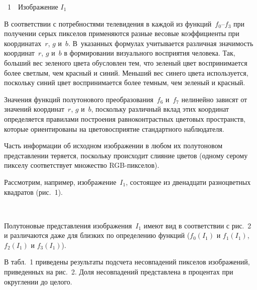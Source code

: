 \begin{multicols}{2}
\begin{center}
{{\figurename~1}\ \ \small{Изображение $I_1$}}
  \end{center}

\vspace*{3pt}

\renewcommand{\figurename}{\protect\bf Рис.}
\renewcommand{\tablename}{\protect\bf Таблица}
\setcounter{figure}{2}
\setcounter{table}{1}





  В соответствии с потребностями телевидения в каждой из функций~$f_0$--$f_3$
  при получении серых пикселов применяются разные весовые
коэффициенты при координатах~$r$, $g$ и~$b$.
%
В~указанных формулах
учитывается различная значимость координат~$r$, $g$ и~$b$ в формировании
визуального восприятия человека. Так, больший вес зеленого цвета обусловлен
тем, что зеленый цвет воспринимается более светлым, чем красный и синий.
Меньший вес синего цвета используется, поскольку синий цвет
воспринимается более темным, чем зеленый и красный.

  Значения функций полутонового преобразо\-вания~$f_6$ и~$f_7$ нелинейно
зависят от значений ко\-ор\-динат~$r$, $g$ и~$b$, поскольку различный вклад
этих координат определяется правилами по\-стро\-ения равноконтраст\-ных
цветовых пространств, которые ориентированы на цветовосприятие
стандартного наблюдателя.

  Часть информации об исходном изображении в любом их полутоновом
представлении теряется, поскольку происходит слияние цветов (одному серому
пикселу соответствует множество RGB-пик\-селов).

  Рассмотрим, например, изображение~$I_1$, со\-сто\-ящее из двенадцати
разноцветных квадратов (рис.~1).

\begin{figure*}[b] %
\vspace*{1pt}
\begin{center}
\mbox{%
\epsfxsize=164mm
}
\end{center}
\vspace*{-9pt}
\end{figure*}


  Полутоновые представления изображения~$I_1$ имеют вид в соответствии с
рис.~2 и различаются даже для близких по определению функций ($f_0(I_1)$ и
$f_1(I_1)$, $f_2(I_1)$ и $f_3(I_1)$).


  В табл.~1 приведены результаты подсчета несовпадений пикселов
изображений, приведенных на рис.~2. Доля несовпадений представлена в
процентах при округлении до целого.



\end{multicols}
